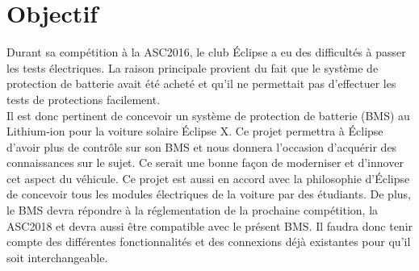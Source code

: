 \section{Objectif}
Durant sa compétition à la ASC2016, le club Éclipse a eu des difficultés à passer les tests électriques. La raison principale provient du fait que le système de protection de batterie avait été acheté et qu’il ne permettait pas d’effectuer les tests de protections facilement.\\

Il est donc pertinent de concevoir un système de protection de batterie (BMS) au Lithium-ion pour la voiture solaire Éclipse X. Ce projet permettra à Éclipse d’avoir plus de contrôle sur son BMS et nous donnera l’occasion d’acquérir des connaissances sur le sujet. Ce serait une bonne façon de moderniser et d'innover cet aspect du véhicule. Ce projet est aussi en accord avec la philosophie d’Éclipse de concevoir tous les modules électriques de la voiture par des étudiants. De plus, le BMS devra répondre à la réglementation de la prochaine compétition, la ASC2018 et devra aussi être compatible avec le présent BMS. Il faudra donc tenir compte des différentes fonctionnalités et des connexions déjà existantes pour qu’il soit interchangeable.